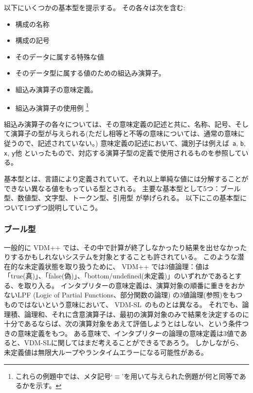 \documentclass[\pformat,12pt]{jarticle}
\newcommand{\vdmslpp}[2]{%
#2
}
\newcommand{\vdmsl}{VDM-SL}
\newcommand{\vdmpp}{VDM++}
\begin{document}
以下にいくつかの基本型を提示する。
その各々は次を含む:

\begin{itemize}
\item 構成の名称
\item 構成の記号
\item そのデータに属する特殊な値
\item そのデータ型に属する値のための組込み演算子。
\item 組込み演算子の意味定義。
\item 組込み演算子の使用例
  \footnote{これらの例題中では、メタ記号`$\equiv$'を用いて与えられた例題が何と同等であるかを示す。}
\end{itemize}
組込み演算子の各々については、その意味定義の記述と共に、名称、記号、そして演算子の型が与えられる(ただし相等と不等の意味については、通常の意味に従うので、記述されていない。)
意味定義の記述において、識別子は例えば\ {\tt a}, {\tt b}, {\tt x}, {\tt y}他 といったもので、対応する演算子型の定義で使用されるものを参照している。

基本型とは、言語により定義されていて、それ以上単純な値には分解することができない異なる値をもっている型とされる。
主要な基本型として5つ：ブール型、数値型、文字型、トークン型、引用型 が挙げられる。
以下にこの基本型について1つずつ説明していこう。

\subsubsection{ブール型}\label{bool}

一般的に \vdmslpp{\vdmsl}{\vdmpp} では、その中で計算が終了しなかったり結果を出せなかったりするかもしれないシステムを対象とすることも許されている。
このような潜在的な未定義状態を取り扱うために、\vdmslpp{\vdmsl}{\vdmpp} では3値論理：値は「true(真)」、「false(偽)」、「bottom/undefined(未定義)」のいずれかであるとする、を取り入る。
インタプリターの意味定義は、演算対象の順番に重きをおかないLPF (Logic of Partial Functions、部分関数の論理) の3値論理(\cite{Jones90a}参照)をもつものではないという意味において、 \vdmsl\ のものとは異なる。
それでも、論理積、論理和、それに含意演算子は、最初の演算対象のみで結果を決定するのに十分であるならば、次の演算対象をあえて評価しようとはしない、という条件つきの意味定義をもつ。
ある意味で、インタプリターの論理の意味定義は3値であると、VDM-SLに関してはまだ考えることができるであろう。
しかしながら、未定義値は無限大ループやランタイムエラーになる可能性がある。
\end{document}
